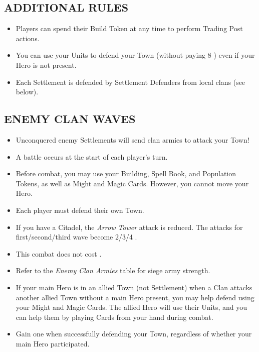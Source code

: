 \begin{multicols}{2}
\subsection*{\MakeUppercase{Additional Rules}}

\begin{itemize}
  \item Players can spend their Build Token at any time to perform Trading Post actions.
  \item You can use your Units to defend your Town (without paying 8 ) even if your Hero is not present.
  \item Each Settlement is defended by Settlement Defenders from local clans (see below).
\end{itemize}

\subsection*{\MakeUppercase{Enemy clan waves}}
\begin{itemize}
  \item Unconquered enemy Settlements will send clan armies to attack your Town!
  \item A battle occurs at the start of each player's turn.
  \item Before combat, you may use your Building, Spell Book, and Population Tokens, as well as Might and Magic Cards. However, you cannot move your Hero.
  \item Each player must defend their own Town.
  \item If you have a Citadel, the \textit{Arrow Tower} attack is reduced. The attacks for first/second/third wave become 2/3/4 .
  \item This combat does not cost .
  \item Refer to the \textit{Enemy Clan Armies} table for siege army strength.
  \item If your main Hero is in an allied Town (not Settlement) when a Clan attacks another allied Town without a main Hero present, you may help defend using your Might and Magic Cards. The allied Hero will use their Units, and you can help them by playing Cards from your hand during combat.
  \item Gain one  when successfully defending your Town, regardless of whether your main Hero participated.
\end{itemize}
\vspace*{\fill}
\columnbreak


\end{multicols}
